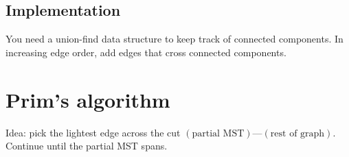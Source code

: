 \subsection{Implementation}
You need a union-find data structure to keep track of connected components. In increasing edge order, add edges that cross connected components.

\section{Prim's algorithm}
Idea: pick the lightest edge across the cut \(\left(\text{partial MST}\right)\)---\(\left(\text{rest of graph}\right)\). Continue until the partial MST spans.	